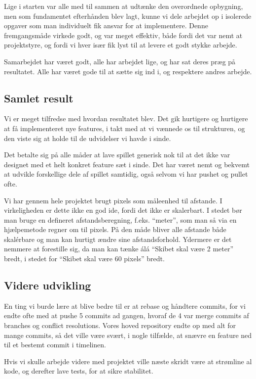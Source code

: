 \documentclass[titlepage,danish]{article}
\begin{document}
Lige i starten var alle med til sammen at udtænke den overordnede opbygning, men som fundamentet
efterhånden blev lagt, kunne vi dele arbejdet op i isolerede opgaver som man individuelt fik ansvar
for at implementere. Denne fremgangsmåde virkede godt, og var meget effektiv, både fordi det var
nemt at projektstyre, og fordi vi hver især fik lyst til at levere et godt stykke arbejde.

Samarbejdet har været godt, alle har arbejdet lige, og har sat deres præg på resultatet. Alle har været
gode til at sætte sig ind i, og respektere andres arbejde.

\subsection{Samlet result}
Vi er meget tilfredse med hvordan resultatet blev. Det gik hurtigere og hurtigere at få
implementeret nye features, i takt med at vi vænnede os til strukturen, og den viste sig at holde
til de udvidelser vi havde i sinde.

Det betalte sig på alle måder at lave spillet generisk nok til at det ikke var designet med et helt
konkret feature sæt i sinde. Det har været nemt og bekvemt at udvikle forskellige dele af spillet
samtidig, også selvom vi har pushet og pullet ofte. 

Vi har gennem hele projektet brugt pixels som måleenhed til afstande. I virkeligheden er dette ikke
en god ide, fordi det ikke er skalerbart. I stedet bør man bruge en defineret afstandsberegning,
f.eks. ``meter'', som man så via en hjælpemetode regner om til pixels. På den måde bliver alle
afstande både skalérbare og man kan hurtigt ændre sine afstandsforhold. Ydermere er det nemmere at
forestille sig, da man kan tænke álá ``Skibet skal være 2 meter'' bredt, i stedet for ``Skibet skal
være 60 pixels'' bredt.

\subsection{Videre udvikling}
En ting vi burde lære at blive bedre til er at rebase og håndtere commits, for vi endte ofte med
at pushe 5 commits ad gangen, hvoraf de 4 var merge commits af branches og conflict
resolutions. Vores hoved repository endte op med alt for mange commits, så det ville være svært, i
nogle tilfælde, at snævre en feature ned til et bestemt commit i timelinen.

Hvis vi skulle arbejde videre med projektet ville næste skridt være at strømline al kode, og
derefter lave tests, for at sikre stabilitet.
\end{document}
